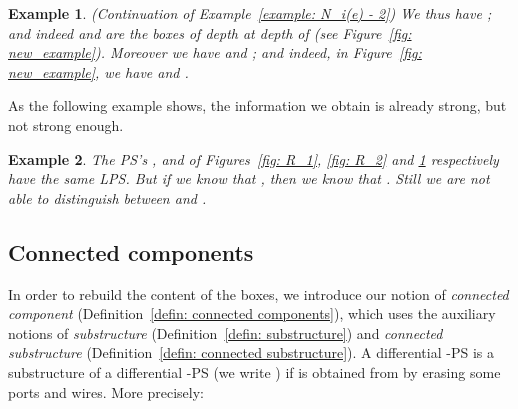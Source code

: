 \documentclass{article}
\theoremstyle{plain}
\newtheorem{definition}{Definition}
\newtheorem{example}{Example}
\newcommand{\scalefactter}{0.33}
\newcommand{\pictter}[1]{\scalebox{\scalefactter}{}}
\begin{document}
\begin{example}
(Continuation of Example~\ref{example: N_i(e) - 2}) We thus have  ; and indeed  and  are the boxes of depth  at depth  of  (see Figure~\ref{fig: new_example}). Moreover we have  and ; and indeed, in Figure~\ref{fig: new_example}, we have    and   .
\end{example}

\begin{comment}
Notice, thanks to Proposition~\ref{prop: critical ports below new boxes}, that the set  does not depend on  and ; it is the set  defined as follows:

\begin{definition}
Let  be a -PS. Let .  Let . We define, by induction on  the set  as follows: 
  \\ 
\end{definition}
\end{comment}

As the following example shows, the information we obtain is already strong, but not strong enough.

\begin{example}
The PS's ,  and  of Figures~\ref{fig: R_1}, \ref{fig: R_2} and \ref{fig: R_3} respectively have the same LPS. But if we know that , then we know that . Still we are not able to distinguish between  and .

\begin{figure}
\centering
\begin{minipage}{0.3\textwidth}
\centering
\pictter{R_1}
\caption{}
\label{fig: R_1}
\end{minipage}\hfill
\begin{minipage}{0.3\textwidth}
\centering
\pictter{R_2}
\caption{}
\label{fig: R_2}
\end{minipage}
\begin{minipage}{0.3\textwidth}
\centering
\pictter{R_3}
\caption{}
\label{fig: R_3}
\end{minipage}
\end{figure}
\end{example}


\subsection{Connected components}

In order to rebuild the content of the boxes, we introduce our notion of \emph{connected component} (Definition~\ref{defin: connected components}), which uses the auxiliary notions of \emph{substructure} (Definition~\ref{defin: substructure}) and \emph{connected substructure} (Definition~\ref{defin: connected substructure}). A differential -PS  is a substructure of a differential -PS  (we write ) if  is obtained from  by erasing some ports and wires. More precisely:
\end{document}
